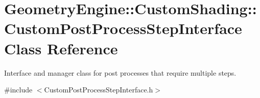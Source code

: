 \hypertarget{class_geometry_engine_1_1_custom_shading_1_1_custom_post_process_step_interface}{}\section{Geometry\+Engine\+::Custom\+Shading\+::Custom\+Post\+Process\+Step\+Interface Class Reference}
\label{class_geometry_engine_1_1_custom_shading_1_1_custom_post_process_step_interface}


Interface and manager class for post processes that require multiple steps.  




{\ttfamily \#include $<$Custom\+Post\+Process\+Step\+Interface.\+h$>$}

